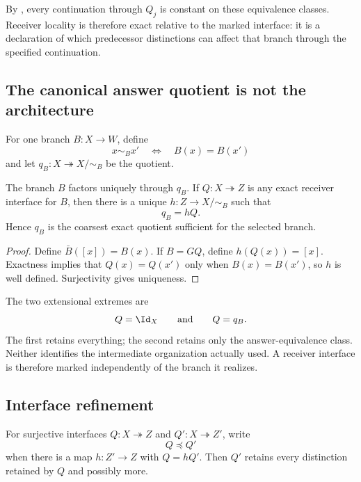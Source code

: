 By , every continuation through $Q_j$ is constant on these equivalence classes. Receiver locality is therefore exact relative to the marked interface: it is a declaration of which predecessor distinctions can affect that branch through the specified continuation.

\subsection{The canonical answer quotient is not the architecture}

For one branch $B:X\to W$, define
\[
x\sim_Bx'
\quad\Longleftrightarrow\quad
B(x)=B(x')
\]
and let $q_B:X\twoheadrightarrow X/{\sim_B}$ be the quotient.

\begin{proposition}\label{prop:canonical-branch-quotient}
The branch $B$ factors uniquely through $q_B$. If $Q:X\twoheadrightarrow Z$ is any exact receiver interface for $B$, then there is a unique $h:Z\to X/{\sim_B}$ such that
\[
q_B=hQ.
\]
Hence $q_B$ is the coarsest exact quotient sufficient for the selected branch.
\end{proposition}

\begin{proof}
Define $\bar B([x])=B(x)$. If $B=GQ$, define $h(Q(x))=[x]$. Exactness implies that $Q(x)=Q(x')$ only when $B(x)=B(x')$, so $h$ is well defined. Surjectivity gives uniqueness.
\end{proof}

The two extensional extremes are
\[
Q=\Id_X
\qquad\text{and}\qquad
Q=q_B.
\]
The first retains everything; the second retains only the answer-equivalence class. Neither identifies the intermediate organization actually used. A receiver interface is therefore marked independently of the branch it realizes.

\subsection{Interface refinement}

\begin{definition}\label{def:interface-refinement}
For surjective interfaces $Q:X\twoheadrightarrow Z$ and $Q':X\twoheadrightarrow Z'$, write
\[
Q\preceq Q'
\]
when there is a map $h:Z'\to Z$ with $Q=hQ'$. Then $Q'$ retains every distinction retained by $Q$ and possibly more.
\end{definition}

